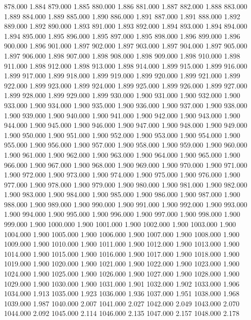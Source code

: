 878.000 1.884 
879.000 1.885 
880.000 1.886 
881.000 1.887 
882.000 1.888 
883.000 1.889 
884.000 1.889 
885.000 1.890 
886.000 1.891 
887.000 1.891 
888.000 1.892 
889.000 1.892 
890.000 1.893 
891.000 1.893 
892.000 1.894 
893.000 1.894 
894.000 1.894 
895.000 1.895 
896.000 1.895 
897.000 1.895 
898.000 1.896 
899.000 1.896 
900.000 1.896 
901.000 1.897 
902.000 1.897 
903.000 1.897 
904.000 1.897 
905.000 1.897 
906.000 1.898 
907.000 1.898 
908.000 1.898 
909.000 1.898 
910.000 1.898 
911.000 1.898 
912.000 1.898 
913.000 1.898 
914.000 1.899 
915.000 1.899 
916.000 1.899 
917.000 1.899 
918.000 1.899 
919.000 1.899 
920.000 1.899 
921.000 1.899 
922.000 1.899 
923.000 1.899 
924.000 1.899 
925.000 1.899 
926.000 1.899 
927.000 1.899 
928.000 1.899 
929.000 1.899 
930.000 1.900 
931.000 1.900 
932.000 1.900 
933.000 1.900 
934.000 1.900 
935.000 1.900 
936.000 1.900 
937.000 1.900 
938.000 1.900 
939.000 1.900 
940.000 1.900 
941.000 1.900 
942.000 1.900 
943.000 1.900 
944.000 1.900 
945.000 1.900 
946.000 1.900 
947.000 1.900 
948.000 1.900 
949.000 1.900 
950.000 1.900 
951.000 1.900 
952.000 1.900 
953.000 1.900 
954.000 1.900 
955.000 1.900 
956.000 1.900 
957.000 1.900 
958.000 1.900 
959.000 1.900 
960.000 1.900 
961.000 1.900 
962.000 1.900 
963.000 1.900 
964.000 1.900 
965.000 1.900 
966.000 1.900 
967.000 1.900 
968.000 1.900 
969.000 1.900 
970.000 1.900 
971.000 1.900 
972.000 1.900 
973.000 1.900 
974.000 1.900 
975.000 1.900 
976.000 1.900 
977.000 1.900 
978.000 1.900 
979.000 1.900 
980.000 1.900 
981.000 1.900 
982.000 1.900 
983.000 1.900 
984.000 1.900 
985.000 1.900 
986.000 1.900 
987.000 1.900 
988.000 1.900 
989.000 1.900 
990.000 1.900 
991.000 1.900 
992.000 1.900 
993.000 1.900 
994.000 1.900 
995.000 1.900 
996.000 1.900 
997.000 1.900 
998.000 1.900 
999.000 1.900 
1000.000 1.900 
1001.000 1.900 
1002.000 1.900 
1003.000 1.900 
1004.000 1.900 
1005.000 1.900 
1006.000 1.900 
1007.000 1.900 
1008.000 1.900 
1009.000 1.900 
1010.000 1.900 
1011.000 1.900 
1012.000 1.900 
1013.000 1.900 
1014.000 1.900 
1015.000 1.900 
1016.000 1.900 
1017.000 1.900 
1018.000 1.900 
1019.000 1.900 
1020.000 1.900 
1021.000 1.900 
1022.000 1.900 
1023.000 1.900 
1024.000 1.900 
1025.000 1.900 
1026.000 1.900 
1027.000 1.900 
1028.000 1.900 
1029.000 1.900 
1030.000 1.900 
1031.000 1.901 
1032.000 1.902 
1033.000 1.906 
1034.000 1.913 
1035.000 1.923 
1036.000 1.936 
1037.000 1.951 
1038.000 1.968 
1039.000 1.987 
1040.000 2.007 
1041.000 2.027 
1042.000 2.049 
1043.000 2.070 
1044.000 2.092 
1045.000 2.114 
1046.000 2.135 
1047.000 2.157 
1048.000 2.178 

